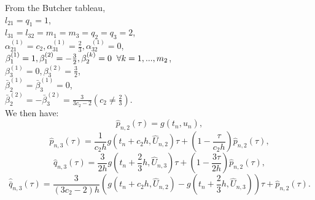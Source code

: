 \documentclass[12pt]{article}
\begin{document}
From the Butcher tableau, \\
$l_{21} = q_1 = 1$,\\
$l_{31} = l_{32} = m_1 = m_3 = q_2 = q_3 = 2$,\\
$\alpha_{21}^{(1)} = c_2 , \alpha_{31}^{(1)} = \frac{2}{3}, \alpha_{32}^{(1)} = 0$,\\
$\beta_1^{(1)} = 1, \beta_1^{(2)} = -\frac{3}{2}, \beta_2^{(k)} = 0 \hspace{.2cm} \forall k = 1,...,m_2$,\\
$\beta_3^{(1)} = 0, \beta_3^{(2)} = \frac{3}{2}$,\\ 
$\bar{\beta}_2^{(1)} = \bar{\beta}_3^{(1)} = 0$,\\
$\bar{\beta}_2^{(2)} = -\bar{\beta}_3^{(2)} = \frac{3}{3c_2 - 2} (c_2 \neq \frac{2}{3})$.\\

We then have:
\begin{equation}
\hat{p}_{n,2}(\tau) = g(t_n,\hat{u}_n), \tag{3.30a} \label{eq: 3.30a}
\end{equation}
\begin{equation}
\hat{p}_{n,3}(\tau) = \frac{1}{c_2h}g(t_n + c_2h,\hat{U}_{n,2})\tau + (1- \frac{\tau}{c_2h})\hat{p}_{n,2}(\tau), \tag{3.30b} \label{eq: 3.30b}
\end{equation}
 \begin{equation}
 \hat{q}_{n,3}(\tau) = \frac{3}{2h}g(t_n + \frac{2}{3}h, \hat{U}_{n,3}) \tau + (1 - \frac{3\tau}{2h})\hat{p}_{n,2}(\tau), \tag{3.30c} \label{eq: 3.30c}
 \end{equation}
 \begin{equation}
 \hat{\bar{q}}_{n,3}(\tau) = \frac{3}{(3c_2-2)h}(g(t_n + c_2h,\hat{U}_{n,2}) - g(t_n + \frac{2}{3}h, \hat{U}_{n,3}) )\tau + \hat{p}_{n,2}(\tau). \tag{3.30c} \label{eq: 3.30d}
 \end{equation}
 

\end{document}
